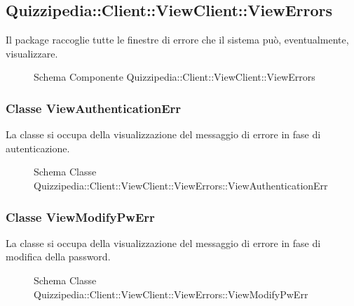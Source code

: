 \subsection{Quizzipedia::Client::ViewClient::ViewErrors}
Il package raccoglie tutte le finestre di errore che il sistema può, eventualmente, visualizzare.
\begin{figure}[H]
\centering
\noindent{}
\caption[Schema Componente Quizzipedia::Client::ViewClient::ViewErrors]{Schema Componente Quizzipedia::Client::ViewClient::ViewErrors}
\end{figure}
\subsubsection{Classe ViewAuthenticationErr}
La classe si occupa della visualizzazione del messaggio di errore in fase di autenticazione.
\begin{figure}[H]
\centering
\noindent{}
\caption[Schema Classe ViewAuthenticationErr]{Schema Classe Quizzipedia::Client::ViewClient::ViewErrors::ViewAuthenticationErr}
\end{figure}
\subsubsection{Classe ViewModifyPwErr}
La classe si occupa della visualizzazione del messaggio di errore in fase di modifica della password.
\begin{figure}[H]
\centering
\noindent{}
\caption[Schema Classe ViewModifyPwErr]{Schema Classe Quizzipedia::Client::ViewClient::ViewErrors::ViewModifyPwErr}
\end{figure}
